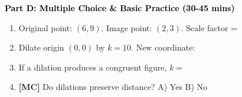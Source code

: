 \documentclass[12pt, letterpaper, fleqn]{article}
\newcommand{\blank}{\underline{\hspace{2.2cm}}}
\begin{document}
\newpage

\begin{tcolorbox}[colback=customteal!20]
\large\textcolor{black}{\textbf{Part D: Multiple Choice \& Basic Practice (30-45 mins)}}
\end{tcolorbox}

\vspace{3mm}

\begin{enumerate}[itemsep=2.5cm, leftmargin=0.6cm, resume]
\item Original point: $(6, 9)$. Image point: $(2, 3)$. Scale factor = \blank
\item Dilate origin $(0,0)$ by $k=10$. New coordinate: \blank
\item If a dilation produces a congruent figure, $k = $ \blank
\item \textbf{[MC]} Do dilations preserve distance? A) Yes B) No
\end{enumerate}
\end{document}
